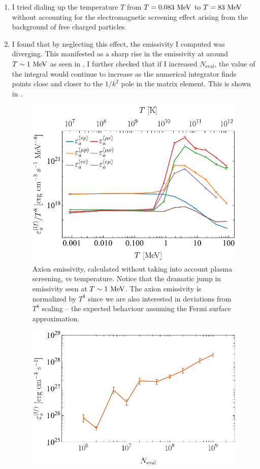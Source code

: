 \begin{enumerate}
    \item I tried dialing up the temperature $T$ from $T = 0.083~\mathrm{MeV}$ to $T = 83~\mathrm{MeV}$ without accounting for the electromagnetic screening effect arising from the background of free charged particles.
    \item I found that by neglecting this effect, the emissivity I computed was diverging. This manifested as a sharp rise in the emissivity at around $T \sim 1 ~\mathrm{MeV}$ as seen in . 
    I further checked that if I increased $N_{\mathrm{eval}}$, the value of the integral would continue to increase as the numerical integrator finds points close and closer to the $1 / k^2$ pole in the matrix element. This is shown in .
    \begin{figure}[htbp]
        \centering
        \includegraphics[width=0.5\linewidth]{figs/divergent-emissivity-vs-temperature.pdf}
        \caption{Axion emissivity, calculated without taking into account plasma screening, vs temperature. Notice that the dramatic jump in emissivity seen at $T \sim 1 ~\mathrm{MeV}$. The axion emissivity is normalized by $T^8$ since we are also interested in deviations from $T^8$ scaling -- the expected behaviour assuming the Fermi surface approximation.}
        \label{fig:divergent-emissivity-vs-temperature}
    \end{figure}
    \begin{figure}[htbp]
        \centering
        \includegraphics[width=0.5\linewidth]{figs/divergent-emissivity-vs-neval.png}

\end{figure}
\end{enumerate}
